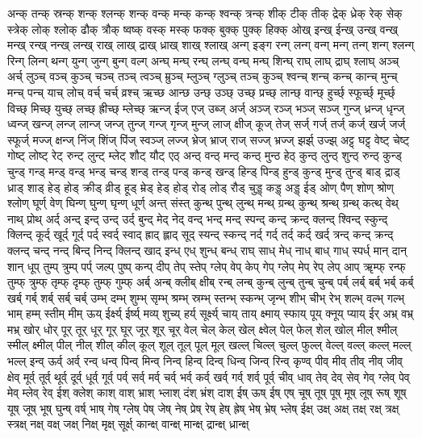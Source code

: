 {	अन्क् तन्क् स्रन्क् शन्क् श्लन्क् शन्क् वन्क् मन्क् कन्क् श्वन्क् त्रन्क् शीक् टीक् तीक् द्रेक् ध्रेक् रेक् सेक् स्त्रेक् लोक् श्लोक् ढौक् त्रौक् ष्वष्क् वस्क् मस्क् फक्क् बुक्क् पुक्क् हिक्क् ओख् इन्ख् ईन्ख् उन्ख् वन्ख् मन्ख् रन्ख् नन्ख् लन्ख् राख् लाख् द्राख् ध्राख् शाख् श्लाख् अन्ग् इङ्ग रन्ग् लन्ग् वन्ग् मन्ग् तन्ग् शन्ग् श्लन्ग् रिन्ग् लिन्ग् थन्ग् युन्ग् जुन्ग् बुन्ग् वल्ग् अन्घ् मन्घ् रन्घ् लन्घ् वन्घ् मन्घ् शिन्घ् राघ् लाघ् द्राघ् श्लाघ् अञ्च् अर्च् लुञ्च् वञ्च् कुञ्च् चञ्च् तञ्च् त्वञ्च् म्रुञ्च् म्लुञ्च् ग्लुञ्च् तञ्च् कुञ्च् श्वन्च् शन्च् कन्च् कान्च् मुन्च् मन्च् पन्च् याच् लोच् वर्च् चर्च् व्रश्च् ऋच्छ आन्छ उन्छ् उञ्छ् उच्छ् प्रच्छ् लान्छ् वान्छ् हुर्च्छ् स्फूर्च्छ् मूर्च्छ् विच्छ् मिच्छ् युच्छ् लच्छ् ह्रीच्छ् म्लेच्छ् ऋन्ज् ईज् एज् उब्ज् अर्ज् अञ्ज् रञ्ज् भञ्ज् सञ्ज् गुन्ज् ध्रन्ज् धृन्ज् ध्वन्ज् खन्ज् लन्ज् लान्ज् जन्ज् तुन्ज् गन्ज् गृन्ज् मुन्ज् लाज् क्षीज् कूज् तेज् सर्ज् गर्ज् तर्ज् कर्ज् खर्ज् जर्ज् स्फूर्ज् मज्ज् क्षन्ज् निंज् शिंज् पिंज् स्वञ्ज् लज्ज् भ्रेज् भ्राज् राज् सज्ज् भ्रज्ज् झर्झ् उज्झ् अट्ट् घट्ट् वेष्ट् चेष्ट् गोष्ट् लोष्ट् रेट् रुन्ट् लुन्ट् म्लेट् शौट् यौट् एठ् अन्ठ् वन्ठ् मन्ठ् कन्ठ् मुन्ठ हेठ् कुन्ठ् लुन्ठ् शुन्ठ् रुन्ठ् कुन्ड् चुन्ड् गन्ड् मन्ड् वन्ड् भन्ड् चन्ड् शन्ड् तन्ड् पन्ड् कन्ड् खन्ड् हिन्ड् पिन्ड् हुन्ड् कुन्ड् मुन्ड् तुन्ड् बाड् द्राड् ध्राड् शाड् हेड् होड् क्रीड् व्रीड् हूड् म्रेड् हेड् होड् रोड् लोड् रौड् चुड्ड् कड्ड् अड्ड् ईड् ओण् पैण् शोण् श्रोण् श्लोण् घूर्ण् वेण् घिन्ण् घुन्ण् घृन्ण् धूर्ण् अन्त् संस्त् कुन्थ् पुन्थ् लुन्थ् मन्थ् ग्रन्थ् कुन्थ् श्रन्थ् ग्रन्थ् कत्थ् वेथ् नाथ् प्रोथ् अर्द् अन्द् इन्द् उन्द् उर्द् बुन्द् मेद् नेद् वन्द् भन्द् मन्द् स्पन्द् कन्द् क्रन्द् क्लन्द् श्विन्द् स्कुन्द् क्लिन्द् कूर्द् खूर्द् गूर्द् पर्द् स्वर्द् स्वाद् ह्राद् ह्लाद् सूद् स्यन्द् स्कन्द् नर्द् गर्द् तर्द् कर्द् खर्द् त्रन्द् कन्द् क्रन्द् क्लन्द् चन्द् नन्द् बिन्द् निन्द् क्लिन्द् खाद् इन्ध् एध् शुन्ध् बन्ध् राघ् साध् मेध् नाध् बाध् गाध् स्पर्ध् मान् दान् शान् धूप् तुम्प् त्रुम्प् पर्प् जल्प् पुष्प् कन्प् दीप् तेप् स्तेप् ग्लेप् वेप् केप् गेप् ग्लेप् मेप् रेप् लेप् आप् ॠम्फ् रन्फ् तुम्फ् त्रुम्फ् तृम्फ् दृम्फ् तुम्फ् गुम्फ् अर्ब् अन्ब् क्लीब् क्षीब् रन्ब् लन्ब् कुन्ब् लुन्ब् तुन्ब् चुन्ब् पर्ब् लर्ब् बर्ब् भर्ब् कर्ब् खर्ब् गर्ब् शर्ब् सर्ब् चर्ब् उम्भ् दम्भ् शुम्भ् सृम्भ् श्रम्भ् स्रम्भ् स्तन्भ् स्कन्भ् जृन्भ् शीभ् चीभ् रेभ् शल्भ् वल्भ् गल्भ् भाम् हम्म् स्तीम् मीम् ऊय् ईर्क्ष्य् ईर्ष्य् मव्य् शुच्य् हर्य् सूर्क्ष्य् चाय् ताय् क्ष्माय् स्फाय् पूय् क्नूय् प्याय् ईर् अभ्र् वभ्र् मभ्र् खोर् धोर् पूर् तूर् धूर् गूर् घूर् जूर् शूर् चूर् वेल् चेल् केल् खेल् क्ष्वेल् पेल् फेल् शेल् खोल् मील् श्मील् स्मील् क्ष्मील् पील् नील् शील् कील् कूल् शूल् तूल् पूल् मूल् खल्ल् चिल्ल् चुल्ल् फुल्ल् वेल्ल् वल्ल् कल्ल् मल्ल् भल्ल् इन्व् ऊर्व् अर्व् रन्व् धन्व् पिन्व् मिन्व् निन्व् हिन्व् दिन्व् धिन्व् जिन्व् रिन्व् कृण्व् पीव् मीव् तीव् नीव् जीव् क्षेव् मूर्व् तूर्व् थूर्व् दूर्व् धूर्व् गूर्व् पर्व् सर्व् मर्व् चर्व् भर्व् कर्व् खर्व् गर्व् शर्व् पूर्व् चीव् धाव् तेव् देव् सेव् गेव् ग्लेव् पेव् मेव् म्लेव् रेव् ईश् क्लेश् काश् वाश् भ्राश् भ्लाश् दंश् भ्रंश् दाश् ईष् ऊष् ईष् एष् चूष् तूष् पूष् मूष् लूष् रूष् शूष् यूष् जूष् भूष् घुन्ष् वर्ष् भाष् गेष् ग्लेष् पेष् जेष् नेष् प्रेष् रेष् हेष् ह्रेष् भेष् भ्रेष् भ्लेष् ईक्ष् उक्ष् अक्ष् तक्ष् रक्ष् त्रक्ष् स्त्रक्ष् नक्ष् वक्ष् जक्ष् निक्ष् मृक्ष् सूर्क्ष् कान्क्ष् वान्क्ष् मान्क्ष् द्रान्क्ष् ध्रान्क्ष् }
